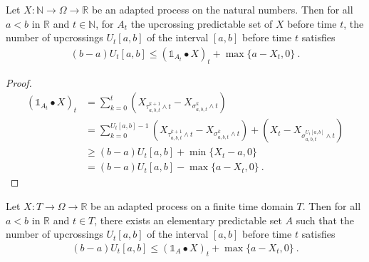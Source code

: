 \begin{lemma}\label{lem:upcrossing_simpleProcess_le_nat}
Let $X : \mathbb{N} \to \Omega \to \mathbb{R}$ be an adapted process on the natural numbers.
Then for all $a < b$ in $\mathbb{R}$ and $t \in \mathbb{N}$, for $A_t$ the upcrossing predictable set of $X$ before time $t$, the number of upcrossings $U_t[a, b]$ of the interval $[a, b]$ before time $t$ satisfies
\begin{align*}
  (b - a) U_t[a, b] \le (\mathbb{1}_{A_t} \bullet X)_t + \max\{a - X_t, 0\}
  \:.
\end{align*}
\end{lemma}

\begin{proof}
\begin{align*}
  (\mathbb{1}_{A_t} \bullet X)_t
  &= \sum_{k=0}^t (X_{\tau^{k+1}_{a, b, t} \wedge t} - X_{\sigma^k_{a, b, t} \wedge t})
  \\
  &= \sum_{k=0}^{U_t[a, b]-1} (X_{\tau^{k+1}_{a, b, t} \wedge t} - X_{\sigma^k_{a, b, t} \wedge t})
    + (X_t - X_{\sigma^{U_t[a, b]}_{a, b, t} \wedge t})
  \\
  &\ge (b - a) U_t[a, b] + \min\{X_t - a, 0\}
  \\
  &= (b - a) U_t[a, b] - \max\{a - X_t, 0\}
  \: .
\end{align*}
\end{proof}

\begin{lemma}\label{lem:upcrossing_simpleProcess_le}
Let $X : T \to \Omega \to \mathbb{R}$ be an adapted process on a finite time domain $T$.
Then for all $a < b$ in $\mathbb{R}$ and $t \in T$, there exists an elementary predictable set $A$ such that the number of upcrossings $U_t[a, b]$ of the interval $[a, b]$ before time $t$ satisfies
\begin{align*}
  (b - a) U_t[a, b] \le (\mathbb{1}_A \bullet X)_t + \max\{a - X_t, 0\}
  \:.
\end{align*}
\end{lemma}

